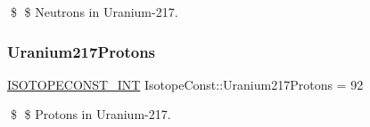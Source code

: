 \$ \$ Neutrons in Uranium-\/217. \mbox{\label{group___isotope_const-_uranium-_u217_ga1cb31e355e0023cba587dfca37c7b55a}} 
\subsubsection{\texorpdfstring{Uranium217\+Protons}{Uranium217Protons}}
{\footnotesize\ttfamily \mbox{\hyperlink{group___isotope_const-_macros_ga5f18360b3e99483a35c32d789e62621c}{I\+S\+O\+T\+O\+P\+E\+C\+O\+N\+S\+T\+\_\+\+I\+NT}} Isotope\+Const\+::\+Uranium217\+Protons = 92}

\$ \$ Protons in Uranium-\/217. 
